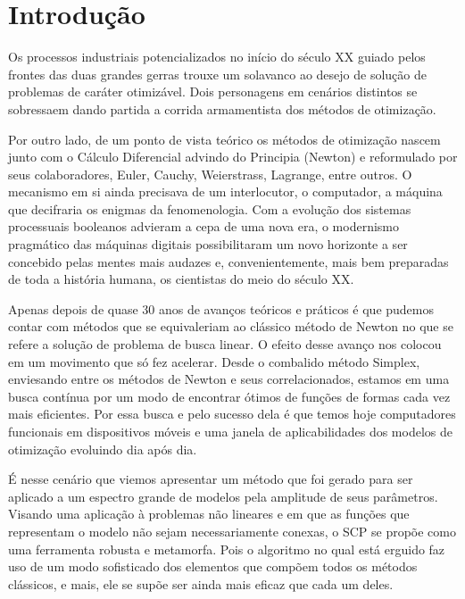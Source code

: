 
\chapter{\larger Introdução}
\label{chap:introducao}
		
Os processos industriais potencializados no início do século XX guiado pelos frontes das duas grandes gerras trouxe um solavanco ao desejo de solução de problemas de caráter otimizável. Dois personagens em cenários distintos se sobressaem dando partida a corrida armamentista dos métodos de otimização.

Por outro lado, de um ponto de vista teórico os métodos de otimização nascem junto com o Cálculo Diferencial advindo do Principia (Newton) e reformulado por seus colaboradores, Euler, Cauchy, Weierstrass, Lagrange, entre outros. O mecanismo em si ainda precisava de um interlocutor, o computador, a máquina que decifraria os enigmas da fenomenologia. Com a evolução dos sistemas processuais booleanos advieram a cepa de uma nova era, o modernismo pragmático das máquinas digitais possibilitaram um novo horizonte a ser concebido pelas mentes mais audazes e, convenientemente, mais bem preparadas de toda a história humana, os cientistas do meio do século XX. 

Apenas depois de quase 30 anos de avanços teóricos e práticos é que pudemos contar com métodos que se equivaleriam ao clássico método de Newton no que se refere a solução de problema de busca linear. O efeito desse avanço nos colocou em um movimento que só fez acelerar. Desde o combalido método Simplex, enviesando entre os métodos de Newton e seus correlacionados, estamos em uma busca contínua por um modo de encontrar ótimos de funções de formas cada vez mais eficientes. Por essa busca e pelo sucesso dela é que temos hoje computadores funcionais em dispositivos móveis e uma janela de aplicabilidades dos modelos de otimização evoluindo dia após dia. 

É nesse cenário que viemos apresentar um método que foi gerado para ser aplicado a um espectro grande de modelos pela amplitude de seus parâmetros. Visando uma aplicação à problemas não lineares e em que as funções que representam o modelo não sejam necessariamente conexas, o SCP se propõe como uma ferramenta robusta e metamorfa. Pois o algoritmo no qual está erguido faz uso de um modo sofisticado dos elementos que compõem todos os métodos clássicos, e mais, ele se supõe ser ainda mais eficaz que cada um deles.

